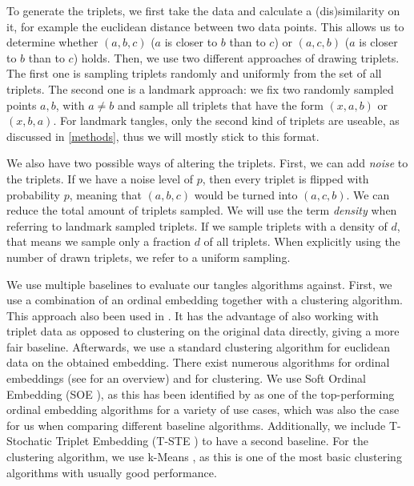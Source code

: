 To generate the triplets, we first take the data and calculate a (dis)similarity on it, for example the euclidean distance between two data points. This allows
us to determine whether $(a,b,c)$ ($a$ is closer to $b$ than to $c$) or $(a,c,b)$ ($a$ is closer to $b$ than to $c$) holds.
Then, we use two different approaches of drawing triplets. The first one is sampling triplets randomly and uniformly from the set of all triplets. The second one is a landmark approach:
we fix two randomly sampled points $a,b$, with $a \neq b$ and sample all triplets that have the form $(x,a,b)$ or $(x,b,a)$.  For landmark tangles, only the 
second kind of triplets are useable, as discussed in \autoref{methods}, thus we will mostly stick to this format. 

We also have two possible ways of altering the triplets. First, we can add \textit{noise}
to the triplets. If we have a noise level of $p$, then every triplet is flipped with probability $p$, meaning that $(a,b,c)$ would be turned into $(a,c,b)$. 
We can reduce the total amount of triplets sampled. We will use the term \textit{density} when referring to landmark sampled triplets. 
If we sample triplets with a density of $d$, that means we sample only a fraction $d$ of all triplets. 
When explicitly using the number of drawn triplets, we refer to a uniform sampling.

We use multiple baselines to evaluate our tangles algorithms against.
First, we use a combination of an ordinal embedding together with a clustering algorithm.  This approach also been used in \cite{kleindessnerLensDepthFunction2017}. 
It has the advantage of also working with triplet data as opposed to clustering on the original data directly, giving a more fair baseline.
Afterwards, we use a standard clustering algorithm for euclidean data on the obtained embedding.  
There exist numerous algorithms for ordinal embeddings (see \cite{vankadaraInsightsOrdinalEmbedding2021} for an overview) and for clustering.  
We use Soft Ordinal Embedding (SOE \cite{teradaLocalOrdinalEmbedding2014}), as this has been identified by \cite{vankadaraInsightsOrdinalEmbedding2021} as one of the 
top-performing ordinal embedding algorithms for a variety of use cases, which was also the case for us when comparing different baseline algorithms.
Additionally, we include T-Stochatic Triplet Embedding (T-STE \cite{laurensvandermaatenStochasticTripletEmbedding2012}) 
to have a second baseline. For the clustering algorithm, we use k-Means \citep{lloydLeastSquaresQuantization1982}, as this is one of the most basic clustering algorithms with usually good performance.

